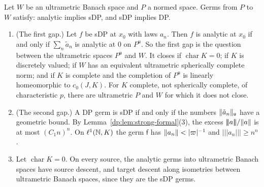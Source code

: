 \begin{corollary}\label{dp:cor:two-gaps}
Let $W$ be an ultrametric Banach space and $P$ a normed space. Germs from $P$ to $W$ satisfy: analytic implies sDP, and sDP implies DP.
\begin{enumerate}
\item \textup{(The first gap.)} Let $f$ be sDP at $x_0$ with laws $a_n$. Then $f$ is analytic at $x_0$ if and only if $\sum_n\tilde a_n$ is analytic at $0$ on $P^{\mathsf u}$. So the first gap is the question between the ultrametric spaces $P^{\mathsf u}$ and $W$. It closes if $\operatorname{char}K=0$; if $K$ is discretely valued; if $W$ has an equivalent ultrametric spherically complete norm; and if $K$ is complete and the completion of $P^{\mathsf u}$ is linearly homeomorphic to $c_0(J,K)$. For $K$ complete, not spherically complete, of characteristic $p$, there are ultrametric $P$ and $W$ for which it does not close.
\item \textup{(The second gap.)} A DP germ is sDP if and only if the numbers $\lVert \tilde a_n\rVert_{\mathsf u}$ have a geometric bound. By Lemma~\ref{dp:lem:strong-formal}(3), the excess $\lvert\!\lvert\!\lvert a\rvert\!\rvert\!\rvert/\lVert a\rVert$ is at most $(C_1n)^n$. On $\ell^1(\mathbb N,K)$ the germ $\mathsf f$ has $\lVert a_n\rVert<\lvert \varpi\rvert^{-1}$ and $\lvert\!\lvert\!\lvert a_n\rvert\!\rvert\!\rvert\ge n^n$.
\item Let $\operatorname{char}K=0$. On every source, the analytic germs into ultrametric Banach spaces have source descent, and target descent along isometries between ultrametric Banach spaces, since they are the sDP germs.
\end{enumerate}
\end{corollary}


